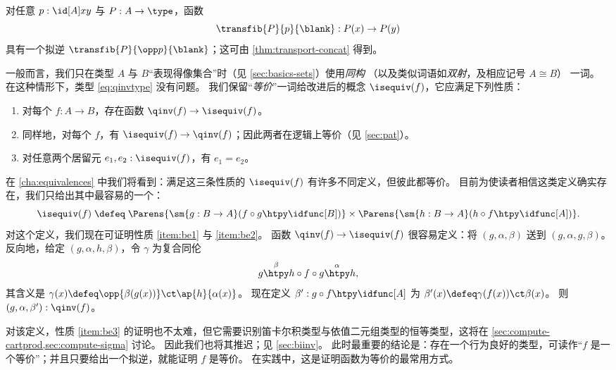 \begin{eg}\label{thm:transportequiv}
  对任意 $p:\id[A]xy$ 与 $P:A\to\type$，函数
  \[\transfib{P}{p}{\blank}:P(x) \to P(y)\]
  具有一个拟逆 $\transfib{P}{\opp p}{\blank}$；这可由 \narrowbreak \cref{thm:transport-concat} 得到。
\end{eg}

一般而言，我们只在类型 $A$ 与 $B$“表现得像集合”时（见 \cref{sec:basics-sets}）使用\emph{同构}
（以及类似词语如\emph{双射}，及相应记号 $A\cong B$）
一词。
在这种情形下，类型 \eqref{eq:qinvtype} 没有问题。
我们保留“\emph{等价}”一词给改进后的概念 $\isequiv (f)$，它应满足下列性质：%
\begin{enumerate}
\item 对每个 $f:A\to B$，存在函数 $\qinv(f) \to \isequiv (f)$。\label{item:be1}
\item 同样地，对每个 $f$，有 $\isequiv (f) \to \qinv(f)$；因此两者在逻辑上等价（见 \cref{sec:pat}）。\label{item:be2}
\item 对任意两个居留元 $e_1,e_2:\isequiv(f)$，有 $e_1=e_2$。\label{item:be3}
\end{enumerate}
在 \cref{cha:equivalences} 中我们将看到：满足这三条性质的 $\isequiv(f)$ 有许多不同定义，但彼此都等价。
目前为使读者相信这类定义确实存在，我们只给出其中最容易的一个：
\begin{equation}\label{eq:isequiv-invertible}
  \isequiv(f) \;\defeq\;
  \Parens{\sm{g:B\to A} (f\circ g \htpy \idfunc[B])}
  \times
  \Parens{\sm{h:B\to A} (h\circ f \htpy \idfunc[A])}.
\end{equation}
对这个定义，我们现在可证明性质 \ref{item:be1} 与 \ref{item:be2}。
函数 $\qinv(f) \to \isequiv (f)$ 很容易定义：将 $(g,\alpha,\beta)$ 送到 $(g,\alpha,g,\beta)$。
反向地，给定 $(g,\alpha,h,\beta)$，令 $\gamma$ 为复合同伦
\[ g \overset{\beta}{\htpy} h\circ f\circ g \overset{\alpha}{\htpy} h, \]
其含义是 $\gamma(x) \defeq \opp{\beta(g(x))} \ct \ap{h}{\alpha(x)}$。
现在定义 $\beta':g\circ f\htpy \idfunc[A]$ 为 $\beta'(x) \defeq \gamma(f(x)) \ct \beta(x)$。
则 $(g,\alpha,\beta'):\qinv(f)$。

对该定义，性质 \ref{item:be3} 的证明也不太难，但它需要识别笛卡尔积类型与依值二元组类型的恒等类型，这将在 \cref{sec:compute-cartprod,sec:compute-sigma} 讨论。
因此我们也将其推迟；见 \cref{sec:biinv}。
此时最重要的结论是：存在一个行为良好的类型，可读作“$f$ 是一个等价”；并且只要给出一个拟逆，就能证明 $f$ 是等价。
在实践中，这是证明函数为等价的最常用方式。

